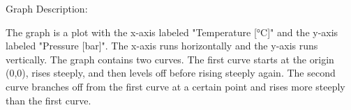 Graph Description:

The graph is a plot with the x-axis labeled "Temperature [°C]" and the y-axis labeled "Pressure [bar]". The x-axis runs horizontally and the y-axis runs vertically. The graph contains two curves. The first curve starts at the origin (0,0), rises steeply, and then levels off before rising steeply again. The second curve branches off from the first curve at a certain point and rises more steeply than the first curve.